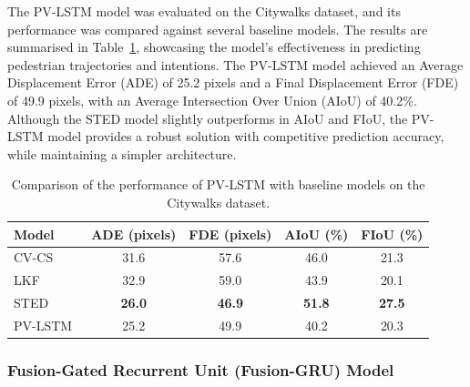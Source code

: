 \documentclass[12pt,oneside]{book} %
\begin{document}
\noindent The PV-LSTM model was evaluated on the Citywalks dataset, and its performance
was compared against several baseline models. The results are summarised in
Table~\ref{tab:pv-lstm-results}, showcasing the model's effectiveness in
predicting pedestrian trajectories and intentions. The PV-LSTM model achieved
an Average Displacement Error (ADE) of 25.2 pixels and a Final Displacement
Error (FDE) of 49.9 pixels, with an Average Intersection Over Union (AIoU) of
40.2\%. Although the STED model slightly outperforms in AIoU and FIoU, the
PV-LSTM model provides a robust solution with competitive prediction accuracy,
while maintaining a simpler architecture.

\begin{table}[H]
    \centering
    \caption{Comparison of the performance of PV-LSTM with baseline models on the Citywalks dataset. }
    \begin{adjustbox}{max width=\textwidth}
        \begin{tabular}{lcccc}
            \toprule
            \textbf{Model}                                   & \textbf{ADE (pixels)} & \textbf{FDE (pixels)} & \textbf{AIoU (\%)} & \textbf{FIoU (\%)} \\ 
            \midrule
            CV-CS~\cite{DBLP:journals/corr/abs-2010-10270}   & 31.6                  & 57.6                  & 46.0               & 21.3               \\
            LKF~\cite{DBLP:journals/corr/abs-2010-10270}     & 32.9                  & 59.0                  & 43.9               & 20.1               \\
            STED~\cite{DBLP:journals/corr/abs-2010-10270}    & \textbf{26.0}         & \textbf{46.9}         & \textbf{51.8}      & \textbf{27.5}      \\
            PV-LSTM~\cite{DBLP:journals/corr/abs-2010-10270} & 25.2                  & 49.9                  & 40.2               & 20.3               \\
            \bottomrule
        \end{tabular}
    \end{adjustbox}
    \label{tab:pv-lstm-results}
\end{table}

\subsubsection*{Fusion-Gated Recurrent Unit (Fusion-GRU) Model}
\end{document}
